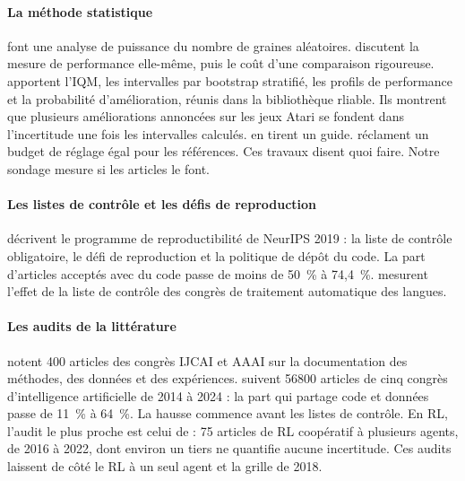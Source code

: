 \paragraph{La méthode statistique}
\textcite{colas2018seeds} font une analyse de puissance du nombre de graines aléatoires. \textcite{jordan2020evaluating}
discutent la mesure de performance elle-même, puis \textcite{jordan2024position} le coût d'une
comparaison rigoureuse. \textcite{agarwal2021precipice} apportent l'IQM, les intervalles par bootstrap
stratifié, les profils de performance et la probabilité d'amélioration, réunis dans la bibliothèque
rliable. Ils montrent que plusieurs améliorations annoncées sur les jeux Atari se fondent dans
l'incertitude une fois les intervalles calculés. \textcite{patterson2024empirical} en tirent un guide.
\textcite{eimer2023hyperparameters} réclament un budget de réglage égal pour les références. Ces travaux
disent quoi faire. Notre sondage mesure si les articles le font.

\paragraph{Les listes de contrôle et les défis de reproduction}
\textcite{pineau2021improving} décrivent le programme de reproductibilité de NeurIPS 2019 : la liste de
contrôle obligatoire, le défi de reproduction et la politique de dépôt du code. La part d'articles
acceptés avec du code passe de moins de 50~\% à 74,4~\%. \textcite{magnusson2023nlpchecklist} mesurent
l'effet de la liste de contrôle des congrès de traitement automatique des langues.

\paragraph{Les audits de la littérature}
\textcite{gundersen2018state} notent 400 articles des congrès IJCAI et AAAI sur la documentation des
méthodes, des données et des expériences. \textcite{coakley2026shift} suivent \num{56800} articles de cinq
congrès d'intelligence artificielle de 2014 à 2024 : la part qui partage code et données passe de 11~\% à 64~\%. La hausse commence avant les listes de contrôle. En RL, l'audit le plus proche est celui de
\textcite{gorsane2022marl} : 75 articles de RL coopératif à plusieurs agents, de 2016 à 2022, dont
environ un tiers ne quantifie aucune incertitude. Ces audits laissent de côté le RL à un seul agent et
la grille de 2018.

